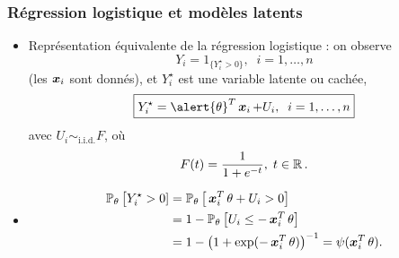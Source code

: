 \begin{frame}
\frametitle{Régression logistique et modèles latents}
\begin{itemize}
\item \alert{Représentation équivalente de la régression logistique} : on observe
$$\boxed{Y_i = 1_{\big\{Y_i^\star >0\big\}},\;\;i=1,\ldots,n}$$
(les $\operatorname{\boldsymbol{x}}_i$ sont donnés), et $Y_i^\star$ est une  \alert{variable latente} ou cachée,
$$\boxed{Y^\star_i =\alert{\truetheta}^T \bx_i + U_i,\;\;i=1,\ldots, n}$$
avec \alert{$U_i\sim_{\text{i.i.d.}} F$}, où
$$F(t) = \frac{1}{1+e^{-t}},\;t \in \operatorname{{\mathbb R}}.$$
\item
\begin{align*}
\operatorname{{\mathbb P}}_\theta\big[Y_i^\star>0] & = \operatorname{{\mathbb P}}_\theta\big[\operatorname{\boldsymbol{x}}_i^T\theta + U_i >0\big] \\
& = 1-\operatorname{{\mathbb P}}_\theta\big[U_i \leq -\operatorname{\boldsymbol{x}}_i^T\theta\big] \\
& = 1-\big(1+\exp(-\operatorname{\boldsymbol{x}}_i^T\theta)\big)^{-1} =  \psi(\operatorname{\boldsymbol{x}}_i^T\theta).
\end{align*}
\end{itemize}
\end{frame}










